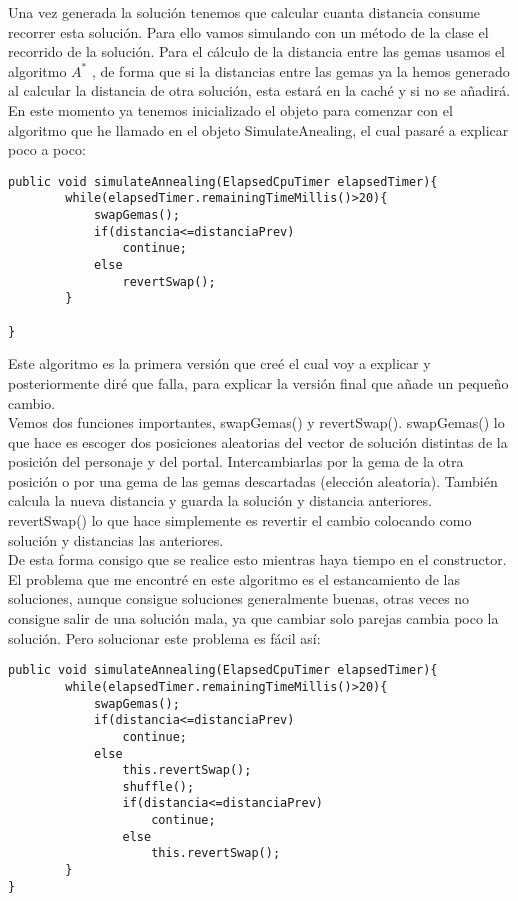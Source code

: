 \documentclass[a4paper,11pt]{article}
\begin{document}
Una vez generada la solución tenemos que calcular cuanta distancia consume recorrer esta solución. Para ello vamos simulando con un método de la clase el recorrido de la solución. Para el cálculo de la distancia entre las gemas usamos el algoritmo $A^*$ , de forma que si la distancias entre las gemas ya la hemos generado al calcular la distancia de otra solución, esta estará en la caché y si no se añadirá.\\

En este momento ya tenemos inicializado el objeto para comenzar con el algoritmo que he llamado en el objeto SimulateAnealing, el cual pasaré a explicar poco a poco:

\begin{lstlisting}
public void simulateAnnealing(ElapsedCpuTimer elapsedTimer){            
        while(elapsedTimer.remainingTimeMillis()>20){
            swapGemas();
            if(distancia<=distanciaPrev)
                continue;
            else
                revertSwap();            
        }
        
}
\end{lstlisting}

Este algoritmo es la primera versión que creé el cual voy a explicar y posteriormente diré que falla, para explicar la versión final que añade un pequeño cambio.\\

Vemos dos funciones importantes, swapGemas() y revertSwap().
swapGemas() lo que hace es escoger dos posiciones aleatorias del vector de solución distintas de la posición del personaje y del portal. Intercambiarlas por la gema de la otra posición o por una gema de las gemas descartadas (elección aleatoria). También calcula la nueva distancia y guarda la solución y distancia anteriores.\\

revertSwap() lo que hace simplemente es revertir el cambio colocando como solución y distancias las anteriores.\\

De esta forma consigo que se realice esto mientras haya tiempo en el constructor.\\

El problema que me encontré en este algoritmo es el estancamiento de las soluciones, aunque consigue soluciones generalmente buenas, otras veces no consigue salir de una solución mala, ya que cambiar solo parejas cambia poco la solución. Pero solucionar este problema es fácil así:

\begin{lstlisting}
public void simulateAnnealing(ElapsedCpuTimer elapsedTimer){            
        while(elapsedTimer.remainingTimeMillis()>20){
            swapGemas();
            if(distancia<=distanciaPrev)
                continue;
            else
                this.revertSwap();
                shuffle();
                if(distancia<=distanciaPrev)
                    continue;
                else
                    this.revertSwap();
        }                
}
\end{lstlisting}
\end{document}

